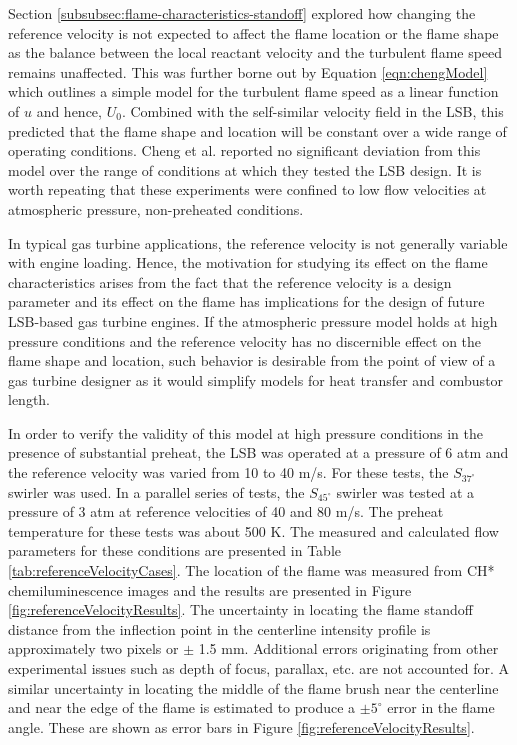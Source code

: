 Section \ref{subsubsec:flame-characteristics-standoff} explored how changing the reference velocity is not expected to affect the flame location or the flame shape as the balance between the local reactant velocity and the turbulent flame speed remains unaffected.
This was further borne out by Equation \ref{eqn:chengModel} which outlines a simple model for the turbulent flame speed as a linear function of \(u\) and hence, \(U_0\).
Combined with the self-similar velocity field in the LSB, this predicted that the flame shape and location will be constant over a wide range of operating conditions.
Cheng et al.\cite{2008-cheng-a} reported no significant deviation from this model over the range of conditions at which they tested the LSB design.
It is worth repeating that these experiments were confined to low flow velocities at atmospheric pressure, non-preheated conditions.

In typical gas turbine applications, the reference velocity is not generally variable with engine loading.
Hence, the motivation for studying its effect on the flame characteristics arises from the fact that the reference velocity is a design parameter and its effect on the flame has implications for the design of future LSB-based gas turbine engines.
If the atmospheric pressure model holds at high pressure conditions and the reference velocity has no discernible effect on the flame shape and location, such behavior is desirable from the point of view of a gas turbine designer as it would simplify models for heat transfer and combustor length.

In order to verify the validity of this model at high pressure conditions in the presence of substantial preheat, the LSB was operated at a pressure of 6 atm and the reference velocity was varied from 10 to 40 m/s.
For these tests, the \(S_{37^\circ}\) swirler was used.
In a parallel series of tests, the \(S_{45^\circ}\) swirler was tested at a pressure of 3 atm at reference velocities of 40 and 80 m/s.
The preheat temperature for these tests was about 500 K.
The measured and calculated flow parameters for these conditions are presented in Table \ref{tab:referenceVelocityCases}.
The location of the flame was measured from CH* chemiluminescence images and the results are presented in Figure \ref{fig:referenceVelocityResults}.
The uncertainty in locating the flame standoff distance from the inflection point in the centerline intensity profile is approximately two pixels or \(\pm\) 1.5 mm.
Additional errors originating from other experimental issues such as depth of focus, parallax, etc. are not accounted for.
A similar uncertainty in locating the middle of the flame brush near the centerline and near the edge of the flame is estimated to produce a \(\pm 5^\circ\) error in the flame angle.
These are shown as error bars in Figure \ref{fig:referenceVelocityResults}.

